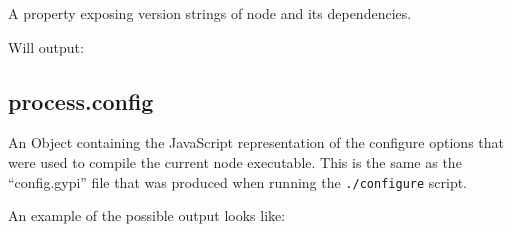 A property exposing version strings of node and its dependencies.

\begin{Shaded}
\begin{Highlighting}[]
\NormalTok{(}\NormalTok{);}
\end{Highlighting}
\end{Shaded}

Will output:

\begin{Shaded}
\begin{Highlighting}[]
\NormalTok{\{ }\NormalTok{: }\NormalTok{,}
  \NormalTok{: }\NormalTok{,}
  \NormalTok{: }\NormalTok{,}
  \NormalTok{: }\NormalTok{,}
  \NormalTok{: } \NormalTok{\}}
\end{Highlighting}
\end{Shaded}

\subsection{process.config}

An Object containing the JavaScript representation of the configure
options that were used to compile the current node executable. This is
the same as the ``config.gypi'' file that was produced when running the
\texttt{./configure} script.

An example of the possible output looks like:

\begin{Shaded}
\begin{Highlighting}[]
\NormalTok{\{ }\NormalTok{:}
   \NormalTok{\{ }\NormalTok{: [],}
     \NormalTok{: }\NormalTok{,}
     \NormalTok{: [],}
     \NormalTok{: [],}
     \NormalTok{: [] \},}
  \NormalTok{:}
   \NormalTok{\{ }\NormalTok{: }\NormalTok{,}
     \NormalTok{: }\NormalTok{,}
     \NormalTok{: }\NormalTok{,}
     \NormalTok{: }\NormalTok{,}
     \NormalTok{: }\NormalTok{,}
     \NormalTok{: }\NormalTok{,}
     \NormalTok{: }\NormalTok{,}
     \NormalTok{: }\NormalTok{,}
     \NormalTok{: }\NormalTok{,}
     \NormalTok{: }\NormalTok{,}
     \NormalTok{: }\NormalTok{,}
     \NormalTok{: } \NormalTok{\} \}}
\end{Highlighting}
\end{Shaded}

